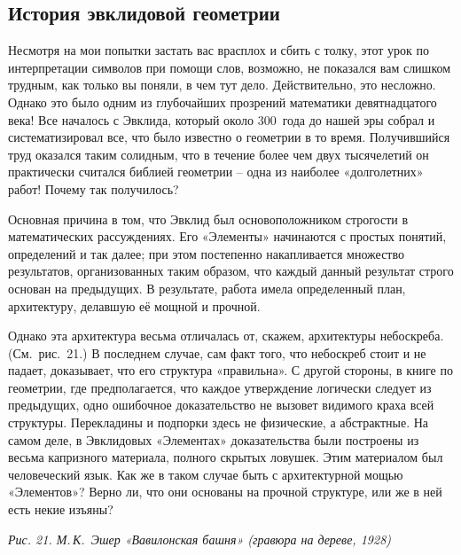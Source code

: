 \documentclass[../main.tex]{subfiles}
\begin{document}
\subsection{История эвклидовой геометрии}

Несмотря на мои попытки застать вас врасплох и сбить с толку, этот урок по интерпретации символов при помощи слов, возможно, не показался вам слишком трудным, как только вы поняли, в чем тут дело. Действительно, это несложно. Однако это было одним из глубочайших прозрений математики девятнадцатого века! Все началось с Эвклида, который около 300~года до нашей эры собрал и систематизировал все, что было известно о геометрии в то время. Получившийся труд оказался таким солидным, что в течение более чем двух тысячелетий он практически считался библией геометрии \--- одна из наиболее «долголетних» работ! Почему так получилось?

Основная причина в том, что Эвклид был основоположником строгости в математических рассуждениях. Его «Элементы» начинаются с простых понятий, определений и так далее; при этом постепенно накапливается множество результатов, организованных таким образом, что каждый данный результат строго основан на предыдущих. В результате, работа имела определенный план, архитектуру, делавшую её мощной и прочной.

Однако эта архитектура весьма отличалась от, скажем, архитектуры небоскреба. (См.~рис.~21.) В последнем случае, сам факт того, что небоскреб стоит и не падает, доказывает, что его структура «правильна». С другой стороны, в книге по геометрии, где предполагается, что каждое утверждение логически следует из предыдущих, одно ошибочное доказательство не вызовет видимого краха всей структуры. Перекладины и подпорки здесь не физические, а абстрактные. На самом деле, в Эвклидовых «Элементах» доказательства были построены из весьма капризного материала, полного скрытых ловушек. Этим материалом был человеческий язык. Как же в таком случае быть с архитектурной мощью «Элементов»? Верно ли, что они основаны на прочной структуре, или же в ней есть некие изъяны?

\emph{Рис. 21. М.\,К.~Эшер «Вавилонская башня» (гравюра на дереве, 1928)}
\end{document}
